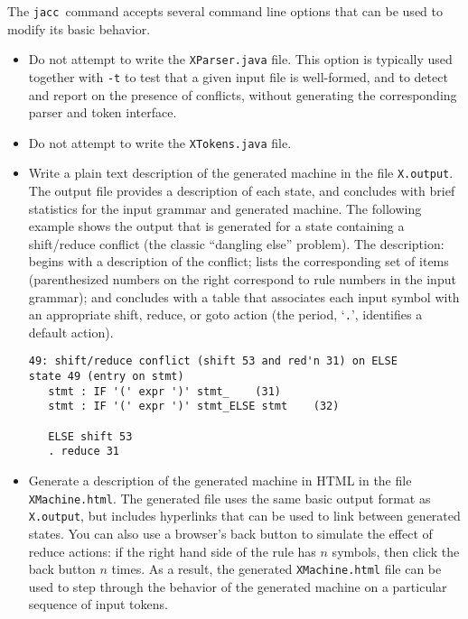 \documentclass[12pt]{article}
\def\jacc{{\tt jacc}}
\begin{document}
The \jacc\ command accepts several command line options
that can be used to modify its basic behavior.
\begin{itemize}
\item[{\tt -p}]
     Do not attempt to write the \verb"XParser.java" file.  This
     option is typically used together with \verb"-t" to test
     that a given input file is well-formed, and to detect and
     report on the presence of conflicts, without generating
     the corresponding parser and token interface.

\item[{\tt -t}]
     Do not attempt to write the \verb"XTokens.java" file.

\item[{\tt -v}]
     Write a plain text description of the generated machine
     in the file \verb"X.output".  The output file provides
     a description of each state, and concludes with brief
     statistics for the input grammar and generated machine.
     The following example shows the output that is generated
     for a state containing a shift/reduce conflict (the
     classic ``dangling else'' problem).  The description:
     begins with a description of the conflict; lists the
     corresponding set of items (parenthesized numbers on
     the right correspond to rule numbers in the input grammar);
     and concludes with a table that associates each input
     symbol with an appropriate shift, reduce, or goto
     action (the period, `\verb"."', identifies a default action).
\begin{verbatim}
49: shift/reduce conflict (shift 53 and red'n 31) on ELSE
state 49 (entry on stmt)
   stmt : IF '(' expr ')' stmt_    (31)
   stmt : IF '(' expr ')' stmt_ELSE stmt    (32)

   ELSE shift 53
   . reduce 31
\end{verbatim}

\item[{\tt -h}]
     Generate a description of the generated machine in HTML
     in the file \verb"XMachine.html".  The generated file uses
     the same basic output format as \verb"X.output",
     but includes hyperlinks that can be used to link
     between generated states.  You can also use a browser's
     back button to simulate the effect of reduce
     actions:  if the right hand side of the rule has $n$ symbols,
     then click the back button $n$ times.  As a result, the
     generated \verb"XMachine.html" file can be used to step
     through the behavior of the generated machine on a
     particular sequence of input tokens.


\end{itemize}
\end{document}
